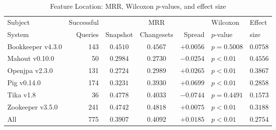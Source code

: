 \begin{table}[t]
\centering
\caption{Feature Location: MRR, Wilcoxon $p$-values, and effect size}
\begin{tabular}{l|r|ccr|ll}
\toprule
Subject & Successful &    & MRR &        & Wilcoxon  & Effect \\
System  & Queries    & Snapshot & Changesets  & Spread & $p$-value & size \\
\midrule
Bookkeeper v4.3.0 & 143 & $0.4510$ & $\bm{0.4567}$ & $+0.0056$ & $p = 0.5008$ & $0.0758$ \\
Mahout v0.10.0 & 50 & $\bm{0.2984}$ & $0.2730$ & $-0.0254$ & $p < 0.01$ & $0.4556$ \\
Openjpa v2.3.0 & 131 & $0.2724$ & $\bm{0.2989}$ & $+0.0265$ & $p < 0.01$ & $0.3867$ \\
Pig v0.14.0 & 174 & $0.3231$ & $\bm{0.3930}$ & $+0.0699$ & $p < 0.01$ & $0.2858$ \\
Tika v1.8 & 36 & $\bm{0.4778}$ & $0.4033$ & $-0.0744$ & $p = 0.4491$ & $0.1573$ \\
Zookeeper v3.5.0 & 241 & $0.4742$ & $\bm{0.4818}$ & $+0.0075$ & $p < 0.01$ & $0.3188$ \\
\midrule
All & 775 & $0.3907$ & $\bm{0.4092}$ & $+0.0185$ & $p < 0.01$ & $0.2754$ \\
\bottomrule
\end{tabular}
\label{table:feature_location_rq1}
\end{table}
